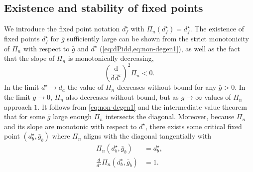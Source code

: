 \subsection{Existence and stability of fixed points}
We introduce the fixed point notation $d^\star_{f}$ with $\Pi_n(d^\star_{f})=d^\star_{f}$.
The existence of fixed points $d^\star_{f}$ for $\bar g$ sufficiently large can be shown from the strict monotonicity of $\Pi_{n}$ with respect to $\bar g$ and $d^\star$ (\cref{eq:dPidd,eq:non-degen1}), as well as the fact that the slope of $\Pi_{n}$ is monotonically decreasing,
\begin{equation}
	\label{eq:non-degen2}
	\left(\frac{\mathrm{d}}{\mathrm{d}d^\star}\right)^2 \Pi_n<0.
\end{equation}
In the limit $d^\star \to d_{a}$ the value of $\Pi_n$ decreases without bound for any $\bar g>0$.
In the limit $\bar g\to 0$, $\Pi_n$ also decreases without bound, but as $\bar g\to \infty$ values of $\Pi_n$ approach $1$.
It follows from \cref{eq:non-degen1} and the intermediate value theorem that for some $\bar g$ large enough $\Pi_n$ intersects the diagonal.
Moreover, because $\Pi_n$ and its slope are monotonic with respect to $d^\star$, there exists some critical fixed point $(d^\star_b, \bar g_b)$ where $\Pi_n$ aligns with the diagonal tangentially with
\begin{align}
	\Pi_n(d^\star_b, \bar g_b)                  & =d^\star_b, \\
	\frac{d}{d^\star}\Pi_n(d^\star_b, \bar g_b) & =1.
\end{align}

